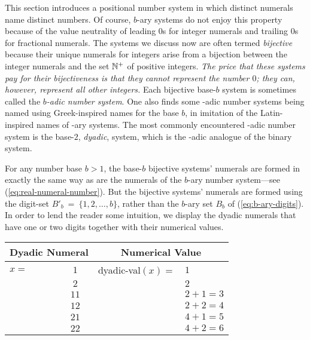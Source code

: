 This section introduces a positional number system in which distinct numerals name distinct numbers.  Of course, $b$-ary systems do not enjoy this property because of the value neutrality of leading $0$s for integer numerals and trailing $0$s for fractional numerals.  The systems we discuss now are often termed {\it bijective} because their unique numerals for integers arise from a bijection between the integer numerals and the set $\mathbb{N}^+$ of positive integers.  {\em The price that these systems pay for their bijectiveness is that they cannot represent the number $0$; they can, however, represent all other integers.}  Each bijective base-$b$ system is sometimes called the {\it $b$-adic number system}.  One also finds some -adic number systems being named using Greek-inspired names for the base $b$, in imitation of the Latin-inspired names of -ary
systems.  The most commonly encountered -adic number system is the base-$2$, {\it dyadic},
system, which is the -adic analogue of the binary system.

\medskip

For any number base $b > 1$, the base-$b$ bijective systems' numerals are formed in exactly the same way as are the numerals of the $b$-ary number system---see (\ref{eq:real-numeral-number}).  But the bijective systems' numerals are formed using the digit-set $B'_b \ = \ \{1, 2,
\ldots, b\}$, rather than the $b$-ary set $B_b$ of (\ref{eq:b-ary-digits}).  In order to lend the reader some intuition, we display the dyadic numerals that have one or two digits together with their numerical values.

\medskip

\begin{tabular}{|lc|ll|}
\multicolumn{2}{c}{\bf Dyadic Numeral} & \multicolumn{2}{c}{\bf Numerical Value} \\
\hline
$x=$ & $1$  & {\sc dyadic-val}$(x) =$ & $1$ \\
     & $2$  &                         & $2$ \\
     & $11$ &                         & $2 + 1 = 3$ \\
     & $12$ &                         & $2 + 2 = 4$ \\
     & $21$ &                         & $4 + 1 = 5$ \\
     & $22$ &                         & $4 + 2 = 6$ \\
\hline
\end{tabular}

